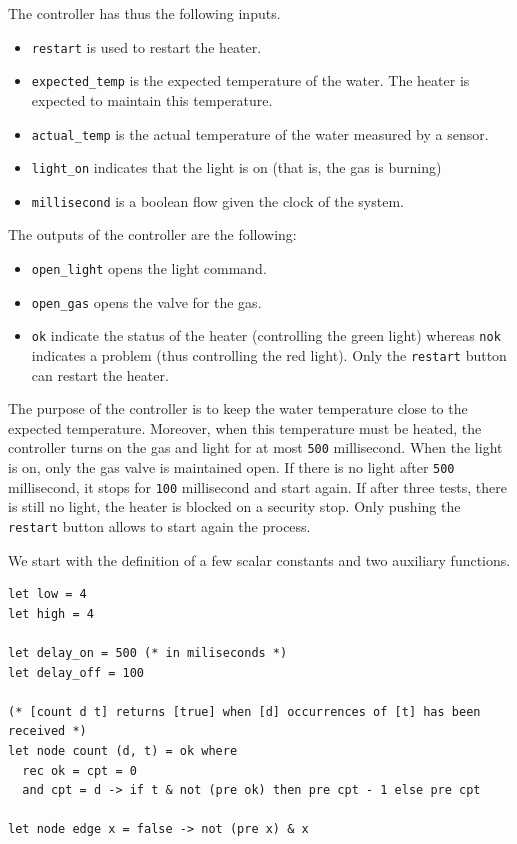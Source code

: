 \documentclass[11pt,titlepage,twoside]{report}
\begin{document}
The controller has thus the following inputs.
\begin{itemize}
\item
\verb-restart- is used to restart the heater.
\item
\verb-expected_temp- is the expected temperature of the water. The heater is
expected to maintain this temperature.
\item
\verb-actual_temp- is the actual temperature of the water measured by a
sensor.
\item
\verb-light_on- indicates that the light is on (that is, the gas is burning)
\item
\verb-millisecond- is a boolean flow given the clock of the system.
\end{itemize}
The outputs of the controller are the following:
\begin{itemize}
\item
\verb-open_light- opens the light command.
\item
\verb-open_gas- opens the valve for the gas.
\item
\verb-ok- indicate the status of the heater (controlling the green light)
whereas \verb-nok- indicates a problem (thus controlling the red light).
Only the \verb-restart- button can restart the heater.
\end{itemize}

The purpose of the controller is to keep the water temperature close
to the expected temperature. Moreover, when this temperature must be
heated, the controller turns on the gas and light for at most
\verb-500- millisecond. When the light is on, only the gas valve is
maintained open.  If there is no light after \verb-500- millisecond,
it stops for \verb-100- millisecond and start again. If after three
tests, there is still no light, the heater is blocked on a security
stop. Only pushing the \verb-restart- button allows to start again the
process.

We start with the definition of a few scalar constants and two auxiliary
functions.

\begin{verbatim}
let low = 4
let high = 4

let delay_on = 500 (* in miliseconds *)
let delay_off = 100

(* [count d t] returns [true] when [d] occurrences of [t] has been received *)
let node count (d, t) = ok where
  rec ok = cpt = 0
  and cpt = d -> if t & not (pre ok) then pre cpt - 1 else pre cpt

let node edge x = false -> not (pre x) & x
\end{verbatim}
\end{document}
